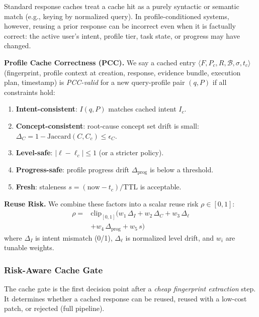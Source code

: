 \documentclass[11pt,a4paper,twocolumn]{article}
\begin{document}
Standard response caches treat a cache hit as a purely syntactic or semantic match (e.g., keying by normalized query). In profile-conditioned systems, however, reusing a prior response can be incorrect even when it is factually correct: the active user's intent, profile tier, task state, or progress may have changed.

\textbf{Profile Cache Correctness (PCC).} We say a cached entry $\langle F, P_c, R, \mathcal{B}, \sigma, t_c\rangle$ (fingerprint, profile context at creation, response, evidence bundle, execution plan, timestamp) is \emph{PCC-valid} for a new query-profile pair $(q, P)$ if all constraints hold:
\begin{enumerate}[leftmargin=*]
  \item \textbf{Intent-consistent}: $I(q, P)$ matches cached intent $I_c$.
  \item \textbf{Concept-consistent}: root-cause concept set drift is small: $\Delta_C = 1 - \text{Jaccard}(C, C_c) \leq \epsilon_C$.
  \item \textbf{Level-safe}: $|\ell - \ell_c| \leq 1$ (or a stricter policy).
  \item \textbf{Progress-safe}: profile progress drift $\Delta_{\text{prog}}$ is below a threshold.
  \item \textbf{Fresh}: staleness $s = (\text{now} - t_c)/\text{TTL}$ is acceptable.
\end{enumerate}

\textbf{Reuse Risk.} We combine these factors into a scalar reuse risk $\rho \in [0,1]$:
\begin{equation}
\label{eq:reuse_risk}
\begin{aligned}
\rho ={}& \text{clip}_{[0,1]}\Big( w_1\,\Delta_I + w_2\,\Delta_C + w_3\,\Delta_\ell \\
& + w_4\,\Delta_{\text{prog}} + w_5\,s \Big)
\end{aligned}
\end{equation}
where $\Delta_I$ is intent mismatch (0/1), $\Delta_\ell$ is normalized level drift, and $w_i$ are tunable weights.

\subsubsection{Risk-Aware Cache Gate}

The cache gate is the first decision point after a \emph{cheap fingerprint extraction} step. It determines whether a cached response can be reused, reused with a low-cost patch, or rejected (full pipeline).
\end{document}
